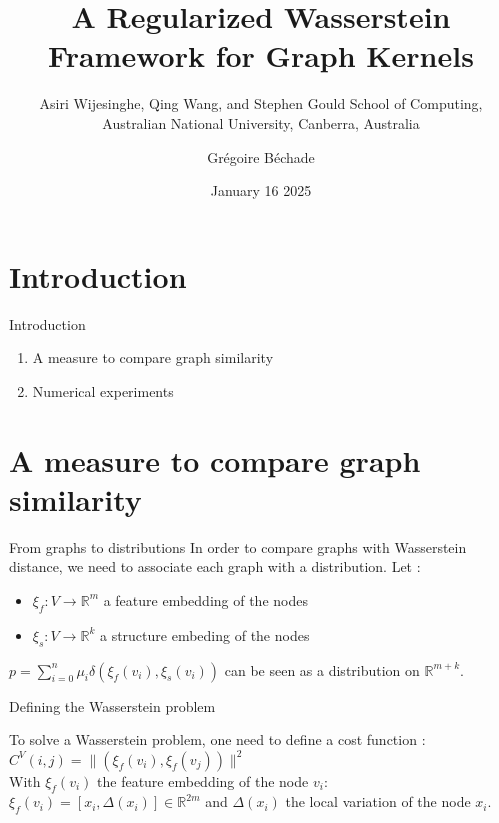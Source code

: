 \documentclass[french]{beamer}
\title{A Regularized Wasserstein Framework for Graph Kernels }
\subtitle{Asiri Wijesinghe, Qing Wang, and Stephen Gould
School of Computing, Australian National University, Canberra, Australia}
\author{Grégoire Béchade}
\date{January 16 2025}
\begin{document}
\begin{frame}
\titlepage
\end{frame}


\section{Introduction}
\begin{frame}{Introduction}

    \begin{enumerate}
        \item A measure to compare graph similarity
        \item Numerical experiments
    \end{enumerate}

\end{frame}

\section{A measure to compare graph similarity}

\begin{frame}{From graphs to distributions}
    In order to compare graphs with Wasserstein distance, we need to associate each graph with a distribution.
    Let : \\
    \begin{itemize}
        \item  $\xi_f : V \rightarrow \mathbb{R}^m$ a feature embedding of the nodes\\
        \item $\xi_s : V \rightarrow \mathbb{R}^k$ a structure embeding of the nodes
    \end{itemize}

$p = \sum_{i=0}^{n} \mu_i \delta(\xi_f(v_i), \xi_s(v_i))$ can be seen as a distribution on $\mathbb{R}^{m+k}$. 
    
\end{frame}

\begin{frame}{Defining the Wasserstein problem}

    To solve a Wasserstein problem, one need to define a cost function : \\[0.3cm]

    $C^V(i,j) = \lVert (\xi_f(v_i), \xi_f(v_j)) \rVert ^2   $\\[0.3cm]

    With $ \xi_f (v_i)$ the feature embedding of the node $v_i$:\\[0.3cm]
    $\xi_f(v_i) = [x_i, \Delta(x_i)] \in \mathbb{R}^{2m}$ and $ \Delta(x_i)$ the local variation of the node $x_i$. \\[0.3cm]
    
\end{frame}
\end{document}
